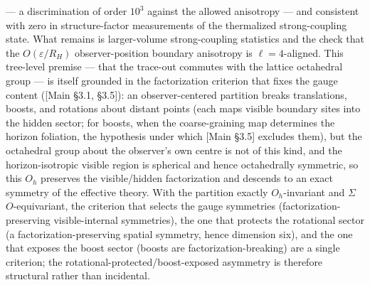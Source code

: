 \documentclass[
]{article}
\begin{document}
--- a discrimination of order \(10^{3}\) against the allowed anisotropy
--- and consistent with zero in structure-factor measurements of the
thermalized strong-coupling state. What remains is larger-volume
strong-coupling statistics and the check that the \(O(\varepsilon/R_H)\)
observer-position boundary anisotropy is \(\ell=4\)-aligned. This
tree-level premise --- that the trace-out commutes with the lattice
octahedral group --- is itself grounded in the factorization criterion
that fixes the gauge content ({[}Main §3.1, §3.5{]}): an
observer-centered partition breaks translations, boosts, and rotations
about distant points (each maps visible boundary sites into the hidden
sector; for boosts, when the coarse-graining map determines the horizon
foliation, the hypothesis under which {[}Main §3.5{]} excludes them),
but the octahedral group about the observer's own centre is not of this
kind, and the horizon-isotropic visible region is spherical and hence
octahedrally symmetric, so this \(O_h\) preserves the visible/hidden
factorization and descends to an exact symmetry of the effective theory.
With the partition exactly \(O_h\)-invariant and \(\Sigma\)
\(O\)-equivariant, the criterion that selects the gauge symmetries
(factorization-preserving visible-internal symmetries), the one that
protects the rotational sector (a factorization-preserving spatial
symmetry, hence dimension six), and the one that exposes the boost
sector (boosts are factorization-breaking) are a single criterion; the
rotational-protected/boost-exposed asymmetry is therefore structural
rather than incidental.
\end{document}
